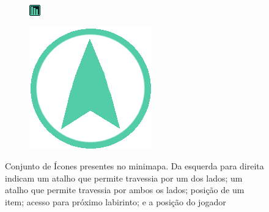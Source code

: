 \begin{figure}[h!]
\begin{subfigure}[b]{0.1\linewidth}
  \end{subfigure}
  \begin{subfigure}[b]{0.1\linewidth}
    \includegraphics[width=\linewidth]{icon4.jpg}
  \end{subfigure}
  \begin{subfigure}[b]{0.1\linewidth}
    \includegraphics[width=\linewidth]{playericon.png}
  \end{subfigure}
  \caption{Conjunto de Ícones presentes no minimapa. Da esquerda para direita indicam um atalho que permite travessia por um dos lados; um atalho que permite travessia por ambos os lados; posição de um item; acesso para próximo labirinto; e a posição do jogador}
  \label{fig:minimapicons}
\end{figure}

